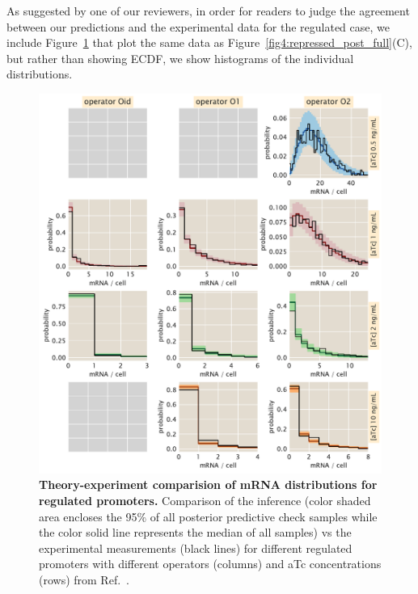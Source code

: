 As suggested by one of our reviewers, in order for readers to judge the
agreement between our predictions and the experimental data for the regulated
case, we include Figure~\ref{figS:reg_histograms} that plot the same data as
Figure~\ref{fig4:repressed_post_full}(C), but rather than showing ECDF, we show
histograms of the individual distributions.

\begin{figure}[p]
\centering
\includegraphics[width=\textwidth]{../../figures/si/figS0X_histograms.pdf}
\caption{\textbf{Theory-experiment comparision of mRNA distributions for
regulated promoters.} Comparison of the inference (color shaded area
encloses the 95\% of all posterior predictive check samples while the color
solid line represents the median of all samples) vs the experimental
measurements (black lines) for different regulated promoters with different
operators (columns) and aTc concentrations (rows) from
Ref.~\cite{Jones2014}.}
\label{figS:reg_histograms}
\end{figure}